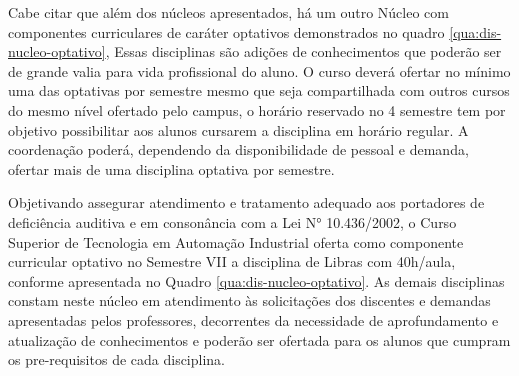 
Cabe citar que além dos núcleos apresentados, há um outro Núcleo com componentes curriculares de caráter optativos demonstrados no quadro \ref{qua:dis-nucleo-optativo}, Essas disciplinas são adições de conhecimentos que poderão ser de grande valia para vida profissional do aluno. O curso deverá ofertar no mínimo uma das optativas por semestre mesmo que seja compartilhada com outros cursos do mesmo nível ofertado pelo campus, o horário reservado no 4 semestre tem por objetivo possibilitar aos alunos cursarem a disciplina em horário regular. A coordenação poderá, dependendo da disponibilidade de pessoal e demanda, ofertar mais de uma disciplina optativa por semestre.\\

\begin{quadro}[!h]	
\centering
{}		
\end{quadro}

Objetivando assegurar atendimento e tratamento adequado aos portadores de deficiência auditiva e em consonância com a Lei N° 10.436/2002, o Curso Superior de Tecnologia em Automação Industrial oferta como componente curricular optativo no Semestre VII a disciplina de Libras com 40h/aula, conforme apresentada no Quadro \ref{qua:dis-nucleo-optativo}. As demais disciplinas constam neste núcleo em atendimento às solicitações dos discentes e demandas apresentadas pelos professores, decorrentes da necessidade de aprofundamento e atualização de conhecimentos e poderão ser ofertada para os alunos que cumpram os pre-requisitos de cada disciplina.\\

